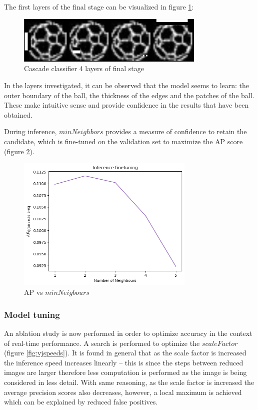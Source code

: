 \documentclass[a4paper,twoside,12pt]{report}
\begin{document}
The first layers of the final stage can be visualized in figure \ref{fig:vjlayers}:

\begin{figure}[h!]
\begin{center}
\includegraphics[width=9cm]{images/vj_result.jpg}
\caption{Cascade classifier 4 layers of final stage}
\label{fig:vjlayers}
\end{center}
\end{figure}

In the layers investigated, it can be observed that the model seems to learn: the outer boundary of the ball, the thickness of the edges and the patches of the ball. These make intuitive sense and provide confidence in the results that have been obtained.

During inference, $minNeighbors$ provides a measure of confidence to retain the candidate, which is fine-tuned on the validation set to maximize the AP score (figure \ref{fig:vjneighbors}).

\begin{figure}[h!]
\begin{center}
\includegraphics[width=8.5cm]{images/vj_tune.png}
\caption{AP vs $minNeigbours$}
\label{fig:vjneighbors}
\end{center}
\end{figure}

\subsubsection{Model tuning}

An ablation study is now performed in order to optimize accuracy in the context of real-time performance. A search is performed to optimize the $scaleFactor$ (figure \ref{fig:vjspeeds}). It is found in general that as the scale factor is increased the inference speed increases linearly -- this is since the steps between reduced images are larger therefore less computation is performed as the image is being considered in less detail. With same reasoning, as the scale factor is increased the average precision scores also decreases, however, a local maximum is achieved which can be explained by reduced false positives.
\end{document}
